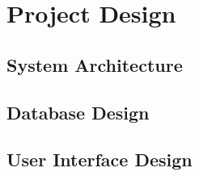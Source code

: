 \chapter{Project Design}
\section{System Architecture}
\section{Database Design}
\section{User Interface Design}
